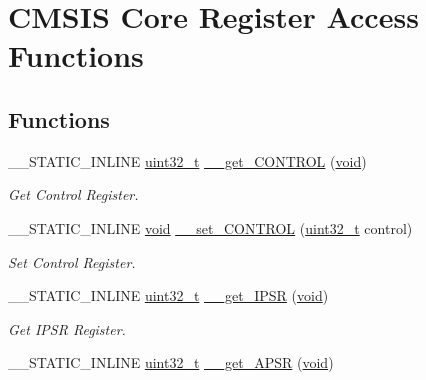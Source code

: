 \hypertarget{group___c_m_s_i_s___core___reg_acc_functions}{\section{C\-M\-S\-I\-S Core Register Access Functions}
\label{group___c_m_s_i_s___core___reg_acc_functions}
}
\subsection*{Functions}
\begin{DoxyCompactItemize}
\item 
\-\_\-\-\_\-\-S\-T\-A\-T\-I\-C\-\_\-\-I\-N\-L\-I\-N\-E \hyperlink{stdint_8h_a435d1572bf3f880d55459d9805097f62}{uint32\-\_\-t} \hyperlink{group___c_m_s_i_s___core___reg_acc_functions_ga963cf236b73219ce78e965deb01b81a7}{\-\_\-\-\_\-get\-\_\-\-C\-O\-N\-T\-R\-O\-L} (\hyperlink{group___n_a_m_e_ga18028b8badbf1ea7e704ccac3c488e82}{void})
\begin{DoxyCompactList}\small\item\em Get Control Register. \end{DoxyCompactList}\item 
\-\_\-\-\_\-\-S\-T\-A\-T\-I\-C\-\_\-\-I\-N\-L\-I\-N\-E \hyperlink{group___n_a_m_e_ga18028b8badbf1ea7e704ccac3c488e82}{void} \hyperlink{group___c_m_s_i_s___core___reg_acc_functions_gac64d37e7ff9de06437f9fb94bbab8b6c}{\-\_\-\-\_\-set\-\_\-\-C\-O\-N\-T\-R\-O\-L} (\hyperlink{stdint_8h_a435d1572bf3f880d55459d9805097f62}{uint32\-\_\-t} control)
\begin{DoxyCompactList}\small\item\em Set Control Register. \end{DoxyCompactList}\item 
\-\_\-\-\_\-\-S\-T\-A\-T\-I\-C\-\_\-\-I\-N\-L\-I\-N\-E \hyperlink{stdint_8h_a435d1572bf3f880d55459d9805097f62}{uint32\-\_\-t} \hyperlink{group___c_m_s_i_s___core___reg_acc_functions_ga2c18685a915eb9b7513a907c2b866636}{\-\_\-\-\_\-get\-\_\-\-I\-P\-S\-R} (\hyperlink{group___n_a_m_e_ga18028b8badbf1ea7e704ccac3c488e82}{void})
\begin{DoxyCompactList}\small\item\em Get I\-P\-S\-R Register. \end{DoxyCompactList}\item 
\-\_\-\-\_\-\-S\-T\-A\-T\-I\-C\-\_\-\-I\-N\-L\-I\-N\-E \hyperlink{stdint_8h_a435d1572bf3f880d55459d9805097f62}{uint32\-\_\-t} \hyperlink{group___c_m_s_i_s___core___reg_acc_functions_gaf082254959c727c663f2334021f1a98a}{\-\_\-\-\_\-get\-\_\-\-A\-P\-S\-R} (\hyperlink{group___n_a_m_e_ga18028b8badbf1ea7e704ccac3c488e82}{void})

\end{DoxyCompactItemize}
